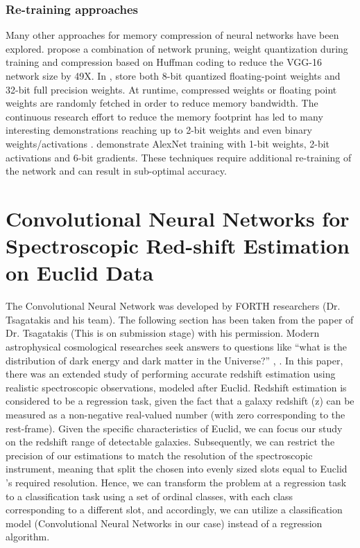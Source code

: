 \subsubsection{Re-training approaches}

Many other approaches for memory compression of neural networks have been explored. \cite{Reference27} propose a combination of network pruning, weight quantization during training and compression based on Huffman coding to reduce the VGG-16 network size by 49X.
In  \cite{Reference21}, store both 8-bit quantized floating-point weights and 32-bit full precision weights.  At runtime, compressed weights or floating point weights are randomly fetched in order to reduce memory bandwidth.  The continuous research effort to reduce the memory footprint has led to many interesting demonstrations reaching up to 2-bit  weights  \cite{Reference22}  and even binary weights/activations \cite{Reference6}. \cite{Reference14} demonstrate AlexNet training with 1-bit weights, 2-bit activations and 6-bit gradients. These techniques require additional re-training of the network and can result in sub-optimal accuracy. 



\section{Convolutional Neural Networks for Spectroscopic Red-shift Estimation on Euclid Data} \label{Euclid}
The Convolutional Neural Network was developed by FORTH researchers (Dr. Tsagatakis and his team). The following section has been taken from the paper of Dr. Tsagatakis (This is on submission stage) with his permission. \cite{Reference75}
Modern astrophysical  cosmological researches seek answers to questions like “what is the distribution of dark energy and dark matter in the Universe?” \cite{Reference66}, \cite{Reference67}. In this paper, there was an extended study of performing accurate redshift estimation using realistic spectroscopic observations, modeled after Euclid. Redshift estimation is considered to be a regression task, given the fact that a galaxy redshift (z) can be measured as a non-negative real-valued number (with zero corresponding to the rest-frame). Given the specific characteristics of Euclid, we can focus our study on the redshift range of detectable galaxies. Subsequently, we can restrict the precision of our estimations to match the resolution of the spectroscopic instrument, meaning that split the chosen into evenly sized slots equal to Euclid ’s required resolution.  Hence, we can transform the problem at a regression task to a classification task using a set of ordinal classes,  with each class corresponding to a different slot, and accordingly, we can utilize a classification model (Convolutional Neural Networks in our case) instead of a regression algorithm.

